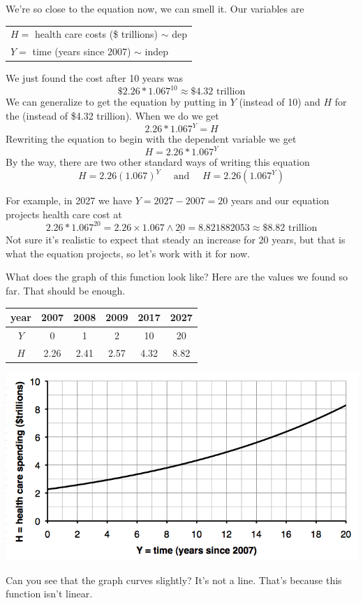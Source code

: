 We're so close to the equation now, we can smell it.   Our variables are 
\begin{center}
\begin{tabular} {l} 
$H=$ health care costs (\$ trillions) $\sim$ dep \\
$Y= $ time (years since 2007) $\sim$ indep \\ 
\end{tabular}
\end{center}We just found the cost after 10 years was 
$$\text{\$2.26}  \ast 1.067^{10}\approx \$4.32 \text{ trillion}$$  
We can generalize to get the equation by putting in $Y$  (instead of 10) and $H$ for the (instead of \$4.32 trillion).  When we do we get
$$2.26  \ast 1.067^{Y} = H$$ 
Rewriting the equation to begin with the dependent variable we get 
$$H = 2.26\ast 1.067^{Y}$$  
By the way, there are two other standard ways of writing this equation  
$$ H= 2.26(1.067)^{Y} \quad \text{ and } \quad H = 2.26\left(1.067^{Y}\right)$$

For example, in 2027 we have $Y=2027 - 2007 = 20$ years and our equation projects health care cost at 
$$2.26 \ast 1.067^{20} = 2.26 \times 1.067 \wedge \underline{20} = 8.821882053 \approx \$8.82 \text{ trillion}$$
Not sure it's realistic to expect that steady an increase for 20 years, but that is what the equation projects, so let's work with it for now.

What does the graph of this function look like?  Here are the values we found so far.  That should be enough.
\begin{center}
\begin{tabular} {|c| |c |c |c |c |c|}\hline
year & 2007 & 2008 & 2009 & 2017 & 2027 \\ \hline
$Y$ & 0 & 1 & 2 & 10 & 20 \\ \hline
$H$ & 2.26 & 2.41 & 2.57 & 4.32 & 8.82 \\ \hline
\end{tabular}
\end{center}

\begin{center}
 {\includegraphics [width = 6in] {healthcarecosts.png}}
\end{center}
Can you see that the graph curves slightly?  It's not a line.  That's because this function isn't linear.
 

